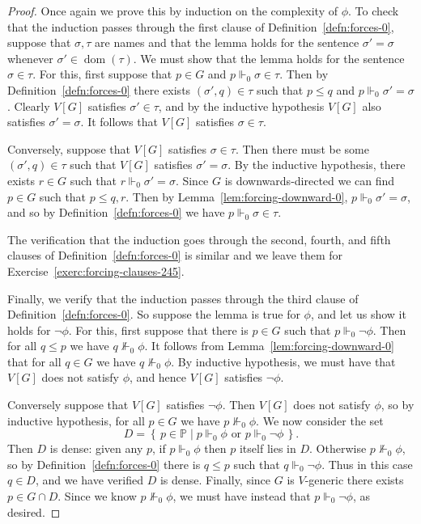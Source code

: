 \documentclass[11pt,oneside]{amsbook}
\newcommand{\set}[1]{\left\{\,#1\,\right\}}
\newcommand{\PP}{\mathbb P}
\newcommand{\forces}{\Vdash}
\DeclareMathOperator{\dom}{dom}
\theoremstyle{definition}
\theoremstyle{plain}
\theoremstyle{definition}
\theoremstyle{remark}
\begin{document}
\begin{proof}
  Once again we prove this by induction on the complexity of $\phi$. To check that the induction passes through the first clause of Definition~\ref{defn:forces-0}, suppose that $\sigma,\tau$ are names and that the lemma holds for the sentence $\sigma'=\sigma$ whenever $\sigma'\in\dom(\tau)$. We must show that the lemma holds for the sentence $\sigma\in\tau$. For this, first suppose that $p\in G$ and $p\forces_0\sigma\in\tau$. Then by Definition~\ref{defn:forces-0} there exists $(\sigma',q)\in\tau$ such that $p\leq q$ and $p\forces_0\sigma'=\sigma$. Clearly $V[G]$ satisfies $\sigma'\in\tau$, and by the inductive hypothesis $V[G]$ also satisfies $\sigma'=\sigma$. It follows that $V[G]$ satisfies $\sigma\in\tau$.

  Conversely, suppose that $V[G]$ satisfies $\sigma\in\tau$. Then there must be some $(\sigma',q)\in\tau$ such that $V[G]$ satisfies $\sigma'=\sigma$. By the inductive hypothesis, there exists $r\in G$ such that $r\forces_0\sigma'=\sigma$. Since $G$ is downwards-directed we can find $p\in G$ such that $p\leq q,r$. Then by Lemma~\ref{lem:forcing-downward-0}, $p\forces_0\sigma'=\sigma$, and so by Definition~\ref{defn:forces-0} we have $p\forces_0\sigma\in\tau$.

  The verification that the induction goes through the second, fourth, and fifth clauses of Definition~\ref{defn:forces-0} is similar and we leave them for Exercise~\ref{exerc:forcing-clauses-245}.

  Finally, we verify that the induction passes through the third clause of Definition~\ref{defn:forces-0}. So suppose the lemma is true for $\phi$, and let us show it holds for $\neg\phi$. For this, first suppose that there is $p\in G$ such that $p\forces_0\neg\phi$. Then for all $q\leq p$ we have $q\not\forces_0\phi$. It follows from Lemma~\ref{lem:forcing-downward-0} that for all $q\in G$ we have $q\not\forces_0\phi$. By inductive hypothesis, we must have that $V[G]$ does not satisfy $\phi$, and hence $V[G]$ satisfies $\neg\phi$.

  Conversely suppose that $V[G]$ satisfies $\neg\phi$. Then $V[G]$ does not satisfy $\phi$, so by inductive hypothesis, for all $p\in G$ we have $p\not\forces_0\phi$. We now consider the set
\[D=\set{p\in\PP\mid p\forces_0\phi\text{ or }p\forces_0\neg\phi}\text{.}
\]
Then $D$ is dense: given any $p$, if $p\forces_0\phi$ then $p$ itself lies in $D$. Otherwise $p\not\forces_0\phi$, so by Definition~\ref{defn:forces-0} there is $q\leq p$ such that $q\forces_0\neg\phi$. Thus in this case $q\in D$, and we have verified $D$ is dense. Finally, since $G$ is $V$-generic there exists $p\in G\cap D$. Since we know $p\not\forces_0\phi$, we must have instead that $p\forces_0\neg\phi$, as desired.
\end{proof}
\end{document}
